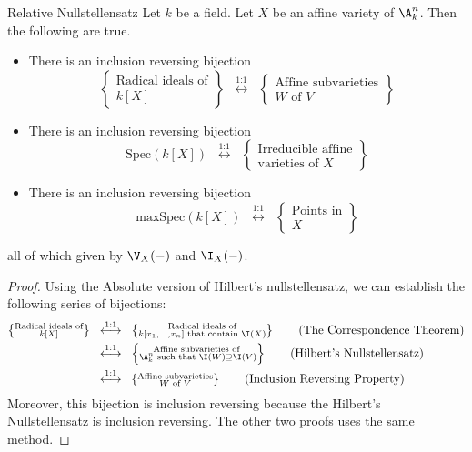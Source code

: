 \documentclass[a4paper]{article}
\begin{document}
\begin{thm}{Relative Nullstellensatz}{} Let $k$ be a field. Let $X$ be an affine variety of $\A_k^n$. Then the following are true. 
\begin{itemize}
\item There is an inclusion reversing bijection $$\left\{\substack{\text{Radical ideals of}\\ k[X]}\right\}\;\;\overset{\text{1:1}}{\longleftrightarrow}\;\;\left\{\substack{\text{Affine subvarieties}\\ W\text{ of }V}\right\}$$
\item There is an inclusion reversing bijection $$\text{Spec}(k[X])\;\;\overset{\text{1:1}}{\longleftrightarrow}\;\;\left\{\substack{\text{Irreducible affine}\\\text{varieties of }X}\right\}$$
\item There is an inclusion reversing bijection $$\text{maxSpec}(k[X])\;\;\overset{\text{1:1}}{\longleftrightarrow}\;\;\left\{\substack{\text{Points in}\\X}\right\}$$
\end{itemize} 
all of which given by $\V_X(-)$ and $\I_X(-)$. \tcbline
\begin{proof}
Using the Absolute version of Hilbert's nullstellensatz, we can establish the following series of bijections: 
\begin{align*}
\left\{\substack{\text{Radical ideals of}\\ k[X]}\right\}\;\;&\overset{\text{1:1}}{\longleftrightarrow}\;\;\left\{\substack{\text{Radical ideals of}\\ k[x_1,\dots,x_n]\text{ that contain }\I(X)}\right\}\tag{The Correspondence Theorem}\\
&\overset{\text{1:1}}{\longleftrightarrow}\;\;\left\{\substack{\text{Affine subvarieties of }\\ \A_k^n\text{ such that }\I(W)\supseteq\I(V)}\right\}\tag{Hilbert's Nullstellensatz}\\
&\overset{\text{1:1}}{\longleftrightarrow}\;\;\left\{\substack{\text{Affine subvarieties}\\ W\text{ of }V}\right\}\tag{Inclusion Reversing Property}\\
\end{align*}
Moreover, this bijection is inclusion reversing because the Hilbert's Nullstellensatz is inclusion reversing. The other two proofs uses the same method. 
\end{proof}
\end{thm}
\end{document}
